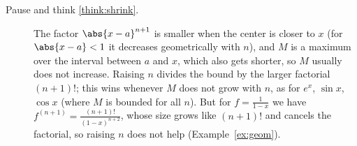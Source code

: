 \documentclass[11pt]{article}
\begin{document}
\begin{description}
  \item[Pause and think \ref{think:shrink}.] The factor $\abs{x-a}^{n+1}$ is smaller when the center is closer to $x$ (for $\abs{x-a}<1$ it decreases geometrically with $n$), and $M$ is a maximum over the interval between $a$ and $x$, which also gets shorter, so $M$ usually does not increase. Raising $n$ divides the bound by the larger factorial $(n+1)!$; this wins whenever $M$ does not grow with $n$, as for $e^x$, $\sin x$, $\cos x$ (where $M$ is bounded for all $n$). But for $f=\frac1{1-x}$ we have $f^{(n+1)}=\frac{(n+1)!}{(1-x)^{n+2}}$, whose size grows like $(n+1)!$ and cancels the factorial, so raising $n$ does not help (Example~\ref{ex:geom}).
\end{description}
\end{document}
